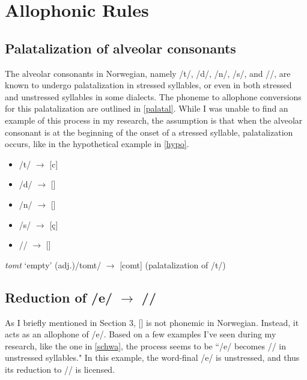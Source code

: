 \documentclass{article}
\begin{document}
\section{Allophonic Rules}
\subsection{Palatalization of alveolar consonants}
The alveolar consonants in Norwegian, namely /t/, /d/, /n/, /s/, and /\textltilde/, are known to undergo palatalization in stressed syllables, or even in both stressed and unstressed syllables in some dialects. \cite{Wikipedia} The phoneme to allophone conversions for this palatalization are outlined in \ref{palatal}. While I was unable to find an example of this process in my research, the assumption is that when the alveolar consonant is at the beginning of the onset of a stressed syllable, palatalization occurs, like in the hypothetical example in \ref{hypo}.

\begin{exe}
    \ex
    \label{palatal}
    \begin{multicols}{2}
    \begin{itemize}
        \item [] /t/ $\rightarrow$ [c]
        \item [] /d/ $\rightarrow$ [\textObardotlessj]
        \item [] /n/ $\rightarrow$ [\textltailn]
        \item [] /s/ $\rightarrow$ [\c{c}]
        \item [] /\textltilde/ $\rightarrow$ [\textturny]
    \end{itemize}
    \end{multicols}
\end{exe}

\begin{exe}
    \ex
    \label{hypo}
    \textit{tomt} `empty' (adj.)\newline /tomt/ $\rightarrow$ [comt] (palatalization of /t/)
\end{exe}

\subsection{Reduction of /e/ $\rightarrow$ /\textschwa/}
As I briefly mentioned in Section 3, [\textschwa] is not phonemic in Norwegian. Instead, it acts as an allophone of /e/. Based on a few examples I've seen during my research, like the one in \ref{schwa}, the process seems to be ``/e/ becomes /\textschwa/ in unstressed syllables." In this example, the word-final /e/ is unstressed, and thus its reduction to /\textschwa/ is licensed. 
\end{document}
